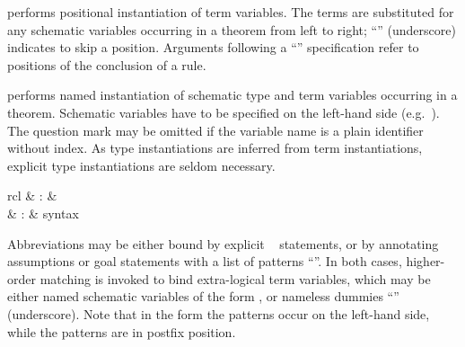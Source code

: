 \begin{isabellebody}
\begin{isamarkuptext}
\begin{descr}
  \item [\mbox{\isa{of}}~\isa{{\isachardoublequote}t\isactrlsub {\isadigit{1}}\ {\isasymdots}\ t\isactrlsub n{\isachardoublequote}}] performs
  positional instantiation of term variables.  The terms  are substituted for any schematic
  variables occurring in a theorem from left to right; ``\isa{{\isacharunderscore}}'' (underscore) indicates to skip a position.  Arguments following
  a ``\mbox{}\isa{{\isachardoublequote}{\isacharcolon}{\isachardoublequote}}'' specification refer to positions
  of the conclusion of a rule.
  
  \item [\mbox{\isa{where}}~\isa{{\isachardoublequote}x\isactrlsub {\isadigit{1}}\ {\isacharequal}\ t\isactrlsub {\isadigit{1}}\ {\isasymAND}\ {\isasymdots}\ x\isactrlsub n\ {\isacharequal}\ t\isactrlsub n{\isachardoublequote}}] performs named instantiation of schematic
  type and term variables occurring in a theorem.  Schematic variables
  have to be specified on the left-hand side (e.g.\ ).
  The question mark may be omitted if the variable name is a plain
  identifier without index.  As type instantiations are inferred from
  term instantiations, explicit type instantiations are seldom
  necessary.

  \end{descr}%
\end{isamarkuptext}%
\isamarkuptrue%
%
\isamarkuptrue%
%
\begin{isamarkuptext}%
\begin{matharray}{rcl}
    \mbox{} & : &  \\
    \mbox{} & : & syntax \\
  \end{matharray}

  Abbreviations may be either bound by explicit \mbox{}~ statements, or by annotating assumptions or
  goal statements with a list of patterns ``''.  In both cases, higher-order matching is invoked to
  bind extra-logical term variables, which may be either named
  schematic variables of the form , or nameless dummies
  ``\mbox{\isa{{\isacharunderscore}}}'' (underscore). Note that in the \mbox{}
  form the patterns occur on the left-hand side, while the \mbox{} patterns are in postfix position.


\end{isamarkuptext}
\end{isabellebody}
